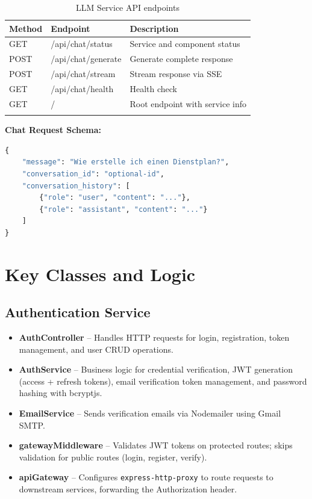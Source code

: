 \documentclass[a4paper,12pt]{report}
\begin{document}
\begin{longtable}{llp{6cm}}
    \toprule
    \textbf{Method} & \textbf{Endpoint} & \textbf{Description} \\
    \midrule
    \endhead
    GET & /api/chat/status & Service and component status \\
    POST & /api/chat/generate & Generate complete response \\
    POST & /api/chat/stream & Stream response via SSE \\
    GET & /api/chat/health & Health check \\
    GET & / & Root endpoint with service info \\
    \bottomrule
\caption{LLM Service API endpoints}
\end{longtable}

\textbf{Chat Request Schema:}
\begin{lstlisting}[language=Python]
{
    "message": "Wie erstelle ich einen Dienstplan?",
    "conversation_id": "optional-id",
    "conversation_history": [
        {"role": "user", "content": "..."},
        {"role": "assistant", "content": "..."}
    ]
}
\end{lstlisting}

\section{Key Classes and Logic}

\subsection{Authentication Service}

\begin{itemize}
    \item \textbf{AuthController} -- Handles HTTP requests for login, registration, token management, and user CRUD operations.
    \item \textbf{AuthService} -- Business logic for credential verification, JWT generation (access + refresh tokens), email verification token management, and password hashing with bcryptjs.
    \item \textbf{EmailService} -- Sends verification emails via Nodemailer using Gmail SMTP.
    \item \textbf{gatewayMiddleware} -- Validates JWT tokens on protected routes; skips validation for public routes (login, register, verify).
    \item \textbf{apiGateway} -- Configures \texttt{express-http-proxy} to route requests to downstream services, forwarding the Authorization header.
\end{itemize}
\end{document}
